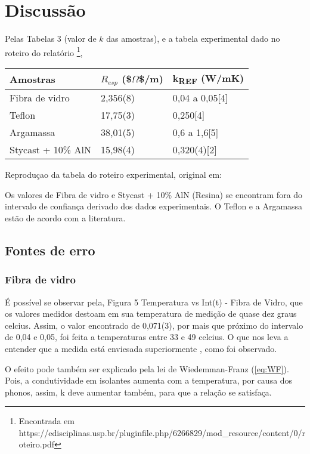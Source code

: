 \documentclass[11pt]{article}
\date{\today}
\title{}
\begin{document}
\tableofcontents

\section{Discussão}
\label{sec:org3f35f70}

Pelas Tabelas 3 (valor de \(k\) das amostras), e a tabela experimental dado no roteiro do relatório \footnote{Encontrada em https://edisciplinas.usp.br/pluginfile.php/6266829/mod_resource/content/0/roteiro.pdf},

\begin{center}
\begin{tabular}{lll}
\hline
Amostras & \(R_{esp}\) (\$\(\Omega\)\$/m) & k\textsubscript{REF} (W/mK)\\
\hline
Fibra de vidro & 2,356(8) & 0,04 a 0,05[4]\\
Teflon & 17,75(3) & 0,250[4]\\
Argamassa & 38,01(5) & 0,6 a 1,6[5]\\
Stycast + 10\% AlN & 15,98(4) & 0,320(4)[2]\\
\hline
\end{tabular}
\end{center}
Reproduçao  da tabela do roteiro experimental, original em: \cite{rebeca2021}

Os valores de Fibra de vidro e Stycast + 10\% AlN (Resina) se encontram fora do intervalo de confiança derivado dos dados experimentais. O Teflon e a Argamassa estão de acordo com a literatura.

\subsection{Fontes de erro}
\label{sec:org117d14d}
\subsubsection{Fibra de vidro}
\label{sec:org724ecf7}
É possível se observar pela, Figura 5 Temperatura vs Int(t) - Fibra de Vidro, que os valores medidos destoam em sua temperatura de medição de quase dez graus celcius. Assim, o valor encontrado de 0,071(3), por mais que próximo do intervalo de 0,04 e 0,05, foi feita a temperaturas entre 33 e 49 celcius. O que nos leva a entender que a medida está enviesada superiormente \cite{ochs2005temperature,budaiwi2002variations}, como foi observado.

O efeito pode também ser explicado pela lei de Wiedemman-Franz (\autoref{eq:WF}). Pois, a condutividade em isolantes aumenta com a temperatura, por causa dos phonos, assim, k deve aumentar também, para que a relação se satisfaça.
\end{document}
